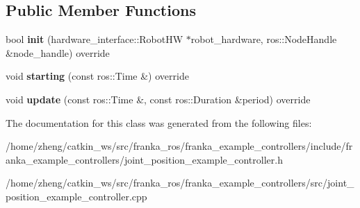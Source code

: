 \subsection*{Public Member Functions}
\begin{DoxyCompactItemize}
\item 
\mbox{\label{classfranka__example__controllers_1_1_joint_position_example_controller_a958b27b475476717543b8cc107bd6c1b}} 
bool {\bfseries init} (hardware\+\_\+interface\+::\+Robot\+HW $\ast$robot\+\_\+hardware, ros\+::\+Node\+Handle \&node\+\_\+handle) override
\item 
\mbox{\label{classfranka__example__controllers_1_1_joint_position_example_controller_a2b8711e7421963f686c7383d624e38a8}} 
void {\bfseries starting} (const ros\+::\+Time \&) override
\item 
\mbox{\label{classfranka__example__controllers_1_1_joint_position_example_controller_a3475db8f06dde9e37fd03660ef4d1cb0}} 
void {\bfseries update} (const ros\+::\+Time \&, const ros\+::\+Duration \&period) override
\end{DoxyCompactItemize}


The documentation for this class was generated from the following files\+:\begin{DoxyCompactItemize}
\item 
/home/zheng/catkin\+\_\+ws/src/franka\+\_\+ros/franka\+\_\+example\+\_\+controllers/include/franka\+\_\+example\+\_\+controllers/joint\+\_\+position\+\_\+example\+\_\+controller.\+h\item 
/home/zheng/catkin\+\_\+ws/src/franka\+\_\+ros/franka\+\_\+example\+\_\+controllers/src/joint\+\_\+position\+\_\+example\+\_\+controller.\+cpp\end{DoxyCompactItemize}
